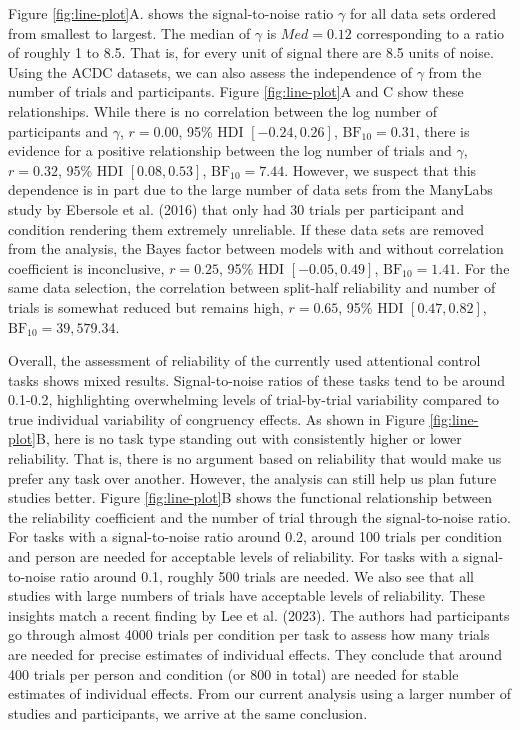 \documentclass[
  man,floatsintext]{apa6}
\begin{document}
Figure \ref{fig:line-plot}A. shows the signal-to-noise ratio \(\gamma\) for all data sets ordered from smallest to largest. The median of \(\gamma\) is \(Med = 0.12\) corresponding to a ratio of roughly 1 to 8.5. That is, for every unit of signal there are 8.5 units of noise. Using the ACDC datasets, we can also assess the independence of \(\gamma\) from the number of trials and participants. Figure \ref{fig:line-plot}A and C show these relationships. While there is no correlation between the log number of participants and \(\gamma\), \(r = 0.00\), 95\% HDI \([-0.24, 0.26]\), \(\mathrm{BF}_{\textrm{10}} = 0.31\), there is evidence for a positive relationship between the log number of trials and \(\gamma\), \(r = 0.32\), 95\% HDI \([0.08, 0.53]\), \(\mathrm{BF}_{\textrm{10}} = 7.44\). However, we suspect that this dependence is in part due to the large number of data sets from the ManyLabs study by Ebersole et al. (2016) that only had 30 trials per participant and condition rendering them extremely unreliable. If these data sets are removed from the analysis, the Bayes factor between models with and without correlation coefficient is inconclusive, \(r = 0.25\), 95\% HDI \([-0.05, 0.49]\), \(\mathrm{BF}_{\textrm{10}} = 1.41\). For the same data selection, the correlation between split-half reliability and number of trials is somewhat reduced but remains high, \(r = 0.65\), 95\% HDI \([0.47, 0.82]\), \(\mathrm{BF}_{\textrm{10}} = 39,579.34\).

Overall, the assessment of reliability of the currently used attentional control tasks shows mixed results. Signal-to-noise ratios of these tasks tend to be around 0.1-0.2, highlighting overwhelming levels of trial-by-trial variability compared to true individual variability of congruency effects. As shown in Figure \ref{fig:line-plot}B, here is no task type standing out with consistently higher or lower reliability. That is, there is no argument based on reliability that would make us prefer any task over another. However, the analysis can still help us plan future studies better. Figure \ref{fig:line-plot}B shows the functional relationship between the reliability coefficient and the number of trial through the signal-to-noise ratio. For tasks with a signal-to-noise ratio around 0.2, around 100 trials per condition and person are needed for acceptable levels of reliability. For tasks with a signal-to-noise ratio around 0.1, roughly 500 trials are needed. We also see that all studies with large numbers of trials have acceptable levels of reliability. These insights match a recent finding by Lee et al. (2023). The authors had participants go through almost 4000 trials per condition per task to assess how many trials are needed for precise estimates of individual effects. They conclude that around 400 trials per person and condition (or 800 in total) are needed for stable estimates of individual effects. From our current analysis using a larger number of studies and participants, we arrive at the same conclusion.
\end{document}
